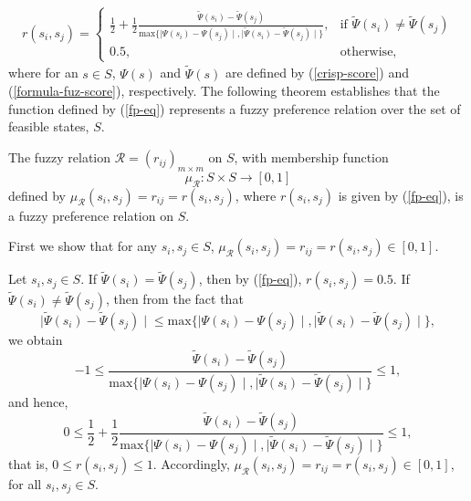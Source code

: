 \begin{equation}\label{fp-eq}
\begin{array}{l}
 r(s_i, s_j)=
 \left\{ \begin{array}{ll}
 \frac{1}{2}+\frac{1}{2} \frac{\widetilde{\Psi}(s_i)-\widetilde{\Psi}(s_j)}{\text{max}\{{\mid \Psi(s_i)-\Psi(s_j) \mid}, {\mid \widetilde{\Psi}(s_i)-\widetilde{\Psi}(s_j) \mid}\}}, & \text{if } \widetilde{\Psi}(s_i) \neq \widetilde{\Psi}(s_j) \\
 0.5, & \text{otherwise},
 \end{array}
 \right.
\end{array}
\end{equation}
where for an $s \in S$, $\Psi(s)$ and $\widetilde{\Psi}(s)$ are defined by (\ref{crisp-score}) and (\ref{formula-fuz-score}), respectively. The following theorem establishes that the function defined by (\ref{fp-eq}) represents a fuzzy preference relation over the set of feasible states, $S$.

\begin{theorem}
\rm The fuzzy relation $\mathcal{R}=(r_{ij})_{m \times m}$ on $S$, with membership function
$$\mu_{\mathcal{R}} : S \times S \longrightarrow [0, 1]$$
defined by $\mu_{\mathcal{R}}(s_i, s_j)=r_{ij}=r(s_i, s_j)$, where $r(s_i, s_j)$ is given by (\ref{fp-eq}), is a fuzzy preference relation on $S$.
\end{theorem}

 First we show that for any $s_i, s_j \in S$, $\mu_{\mathcal{R}}(s_i, s_j)=r_{ij}=r(s_i, s_j) \in [0, 1]$.

\noindent Let $s_i, s_j \in S$. If $\widetilde{\Psi}(s_i)=\widetilde{\Psi}(s_j)$, then by (\ref{fp-eq}), $r(s_i, s_j)=0.5$. If $\widetilde{\Psi}(s_i) \neq \widetilde{\Psi}(s_j)$, then from the fact that
$${\mid \widetilde{\Psi}(s_i)-\widetilde{\Psi}(s_j) \mid} \leq \text{max}\{{\mid \Psi(s_i)-\Psi(s_j) \mid}, {\mid \widetilde{\Psi}(s_i)-\widetilde{\Psi}(s_j) \mid}\},$$
we obtain
$$-1 \leq \frac{\widetilde{\Psi}(s_i)-\widetilde{\Psi}(s_j)}{\text{max}\{{\mid \Psi(s_i)-\Psi(s_j) \mid}, {\mid \widetilde{\Psi}(s_i)-\widetilde{\Psi}(s_j) \mid}\}} \leq 1,$$
and hence,
$$0 \leq \frac{1}{2}+\frac{1}{2} \frac{\widetilde{\Psi}(s_i)-\widetilde{\Psi}(s_j)}{\text{max}\{{\mid \Psi(s_i)-\Psi(s_j) \mid}, {\mid \widetilde{\Psi}(s_i)-\widetilde{\Psi}(s_j) \mid}\}} \leq 1,$$
that is, $0 \leq r(s_i, s_j) \leq 1$. Accordingly, $\mu_{\mathcal{R}}(s_i, s_j)=r_{ij}=r(s_i, s_j) \in [0, 1]$, for all $s_i, s_j \in S$.

